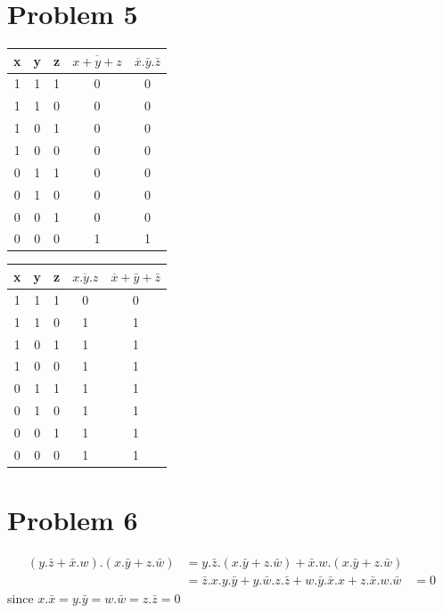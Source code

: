 \documentclass[12pt]{article}
\begin{document}
\section*{Problem 5}
\begin{center}
    \begin{tabular}{ |c|c|c||c|c| }
        x & y & z & $\overline{x+y+z}$ & $\overline{x}.\bar{y}.\bar{z}$\\
        \hline
        1 & 1 & 1 & 0 & 0\\
        \hline
        1 & 1 & 0 & 0 & 0\\
        \hline
        1 & 0 & 1 & 0 & 0\\
        \hline
        1 & 0 & 0 & 0 & 0\\
        \hline
        0 & 1 & 1 & 0 & 0\\
        \hline
        0 & 1 & 0 & 0 & 0\\
        \hline
        0 & 0 & 1 & 0 & 0\\
        \hline
        0 & 0 & 0 & 1 & 1\\
        \hline
    \end{tabular}
\end{center}

\begin{center}
    \begin{tabular}{ |c|c|c||c|c| }
        x & y & z & $\overline{x.y.z}$ & $\overline{x}+\bar{y}+\bar{z}$\\
        \hline
        1 & 1 & 1 & 0 & 0\\
        \hline
        1 & 1 & 0 & 1 & 1\\
        \hline
        1 & 0 & 1 & 1 & 1\\
        \hline
        1 & 0 & 0 & 1 & 1\\
        \hline
        0 & 1 & 1 & 1 & 1\\
        \hline
        0 & 1 & 0 & 1 & 1\\
        \hline
        0 & 0 & 1 & 1 & 1\\
        \hline
        0 & 0 & 0 & 1 & 1\\
        \hline
    \end{tabular}
\end{center}
\section*{Problem 6}
\begin{align*}
    (y.\bar{z}+\bar{x}.w).(x.\bar{y}+z.\bar{w})&=y.\bar{z}.(x.\bar{y}+z.\bar{w})+\bar{x}.w.(x.\bar{y}+z.\bar{w})\\
    &=\bar{z}.x.y.\bar{y}+y.\bar{w}.z.\bar{z}+w.\bar{y}.\bar{x}.x+z.\bar{x}.w.\bar{w}
    &=\boxed{0}
\end{align*}
since $x.\bar{x}=y.\bar{y}=w.\bar{w}=z.\bar{z}=0$
\end{document}
